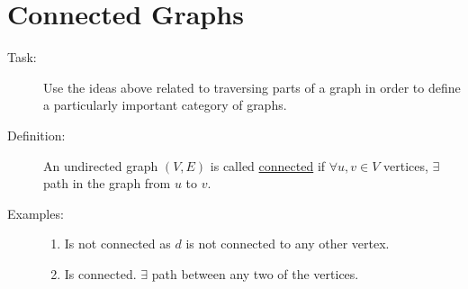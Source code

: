 \documentclass[10pt]{article}
\begin{document}
	\section{Connected Graphs}
	\begin{description}
		\item[Task:] Use the ideas above related to traversing parts of a graph in order to define a particularly important category of graphs.
		\item[Definition:] An undirected graph $(V, E)$ is called \underline{connected} if $\forall u, v \in V$ vertices, $\exists$ path in the graph from $u$ to $v$.
		\item[Examples:]
		\begin{enumerate}
			\item Is not connected as $d$ is not connected to any other vertex.
			\begin{figure}[h!]
				\centering
			\end{figure}
			\pagebreak
			\item Is connected. $\exists$ path between any two of the vertices.
			\begin{figure}[h!]
				\centering
\end{figure}
\end{enumerate}
\end{description}
\end{document}
